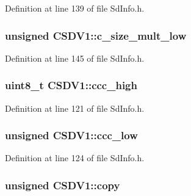 Definition at line 139 of file Sd\+Info.\+h.

\subsubsection[{\texorpdfstring{c\+\_\+size\+\_\+mult\+\_\+low}{c\_size\_mult\_low}}]{\setlength{\rightskip}{0pt plus 5cm}unsigned C\+S\+D\+V1\+::c\+\_\+size\+\_\+mult\+\_\+low}\hypertarget{struct_c_s_d_v1_ae03711699c88be17fd8c56885ee825a7}{}\label{struct_c_s_d_v1_ae03711699c88be17fd8c56885ee825a7}


Definition at line 145 of file Sd\+Info.\+h.

\subsubsection[{\texorpdfstring{ccc\+\_\+high}{ccc\_high}}]{\setlength{\rightskip}{0pt plus 5cm}uint8\+\_\+t C\+S\+D\+V1\+::ccc\+\_\+high}\hypertarget{struct_c_s_d_v1_ae2d032e1cda297ec9da43c9e8d320606}{}\label{struct_c_s_d_v1_ae2d032e1cda297ec9da43c9e8d320606}


Definition at line 121 of file Sd\+Info.\+h.

\subsubsection[{\texorpdfstring{ccc\+\_\+low}{ccc\_low}}]{\setlength{\rightskip}{0pt plus 5cm}unsigned C\+S\+D\+V1\+::ccc\+\_\+low}\hypertarget{struct_c_s_d_v1_a5235d1c520e0e02dd7c363cb85163fe7}{}\label{struct_c_s_d_v1_a5235d1c520e0e02dd7c363cb85163fe7}


Definition at line 124 of file Sd\+Info.\+h.

\subsubsection[{\texorpdfstring{copy}{copy}}]{\setlength{\rightskip}{0pt plus 5cm}unsigned C\+S\+D\+V1\+::copy}\hypertarget{struct_c_s_d_v1_a59b32955a2955914ad68a5207da3634e}{}\label{struct_c_s_d_v1_a59b32955a2955914ad68a5207da3634e}


